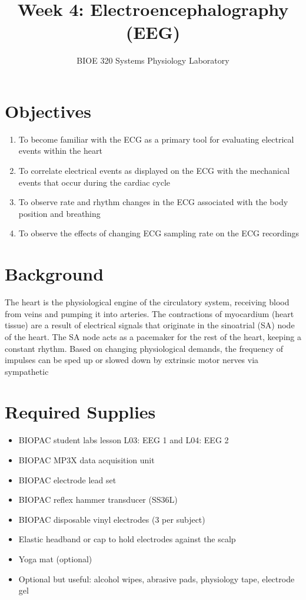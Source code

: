 \documentclass{article}
\title{Week 4: Electroencephalography (EEG)}
\author{BIOE 320 Systems Physiology Laboratory}
\date{}
\begin{document}
\large
\maketitle

\section*{Objectives}
\begin{enumerate}
	\item To become familiar with the ECG as a primary tool for evaluating electrical events within the heart
	\item To correlate electrical events as displayed on the ECG with the mechanical events that occur during the cardiac cycle
	\item To observe rate and rhythm changes in the ECG associated with the body position and breathing
	\item To observe the effects of changing ECG sampling rate on the ECG recordings
\end{enumerate}

\section*{Background}
The heart is the physiological engine of the circulatory system, receiving blood from veins and pumping it into arteries. The contractions of myocardium (heart tissue) are a result of electrical signals that originate in the sinoatrial (SA) node of the heart. The SA node acts as a pacemaker for the rest of the heart, keeping a constant rhythm. Based on changing physiological demands, the frequency of impulses can be sped up or slowed down by extrinsic motor nerves via sympathetic 

\section*{Required Supplies}
\begin{itemize}
	\item BIOPAC student labs lesson L03: EEG 1 and L04: EEG 2
	\item BIOPAC MP3X data acquisition unit
	\item BIOPAC electrode lead set
	\item BIOPAC reflex hammer transducer (SS36L)
	\item BIOPAC disposable vinyl electrodes (3 per subject)
	\item Elastic headband or cap to hold electrodes against the scalp
	\item Yoga mat (optional)
	\item Optional but useful: alcohol wipes, abrasive pads, physiology tape, electrode gel
\end{itemize}
\end{document}
